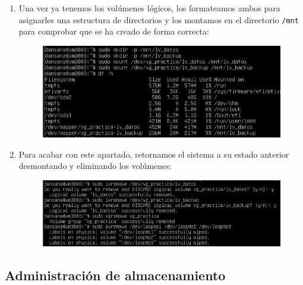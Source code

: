 \documentclass[10pt]{article}
\begin{document}
\begin{enumerate}
\begin{figure}[H]
		\end{figure}
		\item Una vez ya tenemos los volúmenes lógicos, los formateamos ambos para asignarles una estructura de directorios y los montamos en el directorio \verb|/mnt| para comprobar que se ha creado de forma correcta:
		\begin{figure}[H]
			\setlength{\abovecaptionskip}{0cm}
			\setlength{\belowcaptionskip}{0cm}
			\centering
			\includegraphics[width=0.6\linewidth]{Recursos/mountLVM.png}
		\end{figure}
		\item Para acabar con este apartado, retornamos el sistema a su estado anterior desmontando y eliminando los volúmenes: 
		\begin{figure}[H]
			\setlength{\abovecaptionskip}{0cm}
			\setlength{\belowcaptionskip}{0cm}
			\centering
			\includegraphics[width=0.6\linewidth]{Recursos/removeLVM.png}
		\end{figure}
	\end{enumerate}
	
	\subsection{Administración de almacenamiento}
\end{document}
